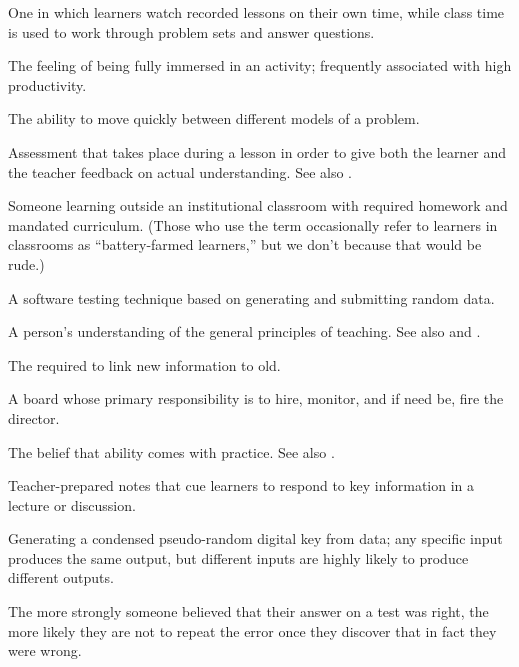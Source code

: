 \begin{description}
 One in which learners watch
recorded lessons on their own time, while class time is used to work through
problem sets and answer questions.

 The feeling of being fully immersed in an activity;
frequently associated with high productivity.

 The ability to move
quickly between different models of a problem.

 Assessment that takes
place during a lesson in order to give both the learner and the teacher
feedback on actual understanding. See
also .

 Someone learning outside an
institutional classroom with required homework and mandated curriculum. (Those
who use the term occasionally refer to learners in classrooms as
``battery-farmed learners,'' but we don't because that would be rude.)

 A software testing technique based on
generating and submitting random data.

 A
person's understanding of the general principles of teaching. See also
and .

 The 
required to link new information to old.

 A board whose primary responsibility is
to hire, monitor, and if need be, fire the director.

 The belief that ability comes with
practice. See also .

 Teacher-prepared notes that cue
learners to respond to key information in a lecture or discussion.

 Generating a condensed pseudo-random digital key
from data; any specific input produces the same output, but different inputs are
highly likely to produce different outputs.

 The more strongly someone
believed that their answer on a test was right, the more likely they are not to
repeat the error once they discover that in fact they were wrong.


\end{description}
